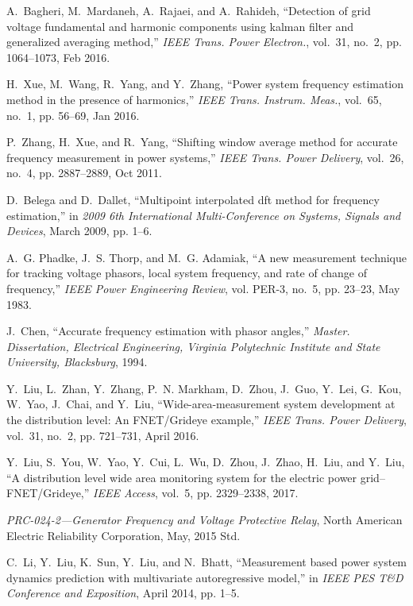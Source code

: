 \documentclass[journal,twoside]{IEEEtran}
\begin{document}
\begin{thebibliography}{10}
	A.~Bagheri, M.~Mardaneh, A.~Rajaei, and A.~Rahideh, ``Detection of grid voltage
	fundamental and harmonic components using kalman filter and generalized
	averaging method,'' \emph{IEEE Trans. Power Electron.}, vol.~31, no.~2, pp.
	1064--1073, Feb 2016.
	
	H.~Xue, M.~Wang, R.~Yang, and Y.~Zhang, ``Power system frequency estimation
	method in the presence of harmonics,'' \emph{IEEE Trans. Instrum. Meas.},
	vol.~65, no.~1, pp. 56--69, Jan 2016.
	
	P.~Zhang, H.~Xue, and R.~Yang, ``Shifting window average method for accurate
	frequency measurement in power systems,'' \emph{IEEE Trans. Power Delivery},
	vol.~26, no.~4, pp. 2887--2889, Oct 2011.
	
	D.~Belega and D.~Dallet, ``Multipoint interpolated dft method for frequency
	estimation,'' in \emph{2009 6th International Multi-Conference on Systems,
		Signals and Devices}, March 2009, pp. 1--6.
	
	A.~G. Phadke, J.~S. Thorp, and M.~G. Adamiak, ``A new measurement technique for
	tracking voltage phasors, local system frequency, and rate of change of
	frequency,'' \emph{IEEE Power Engineering Review}, vol. PER-3, no.~5, pp.
	23--23, May 1983.
	
	J.~Chen, ``Accurate frequency estimation with phasor angles,'' \emph{Master.
		Dissertation, Electrical Engineering, Virginia Polytechnic Institute and
		State University, Blacksburg}, 1994.
	
	Y.~Liu, L.~Zhan, Y.~Zhang, P.~N. Markham, D.~Zhou, J.~Guo, Y.~Lei, G.~Kou,
	W.~Yao, J.~Chai, and Y.~Liu, ``Wide-area-measurement system development at
	the distribution level: An FNET/Grideye example,'' \emph{IEEE Trans. Power
		Delivery}, vol.~31, no.~2, pp. 721--731, April 2016.
	
	Y.~Liu, S.~You, W.~Yao, Y.~Cui, L.~Wu, D.~Zhou, J.~Zhao, H.~Liu, and Y.~Liu,
	``A distribution level wide area monitoring system for the electric power
	grid–FNET/Grideye,'' \emph{IEEE Access}, vol.~5, pp. 2329--2338, 2017.
	
	\emph{PRC-024-2—Generator Frequency and Voltage Protective Relay}, North
	American Electric Reliability Corporation, May, 2015 Std.
	
	C.~Li, Y.~Liu, K.~Sun, Y.~Liu, and N.~Bhatt, ``Measurement based power system
	dynamics prediction with multivariate autoregressive model,'' in \emph{IEEE
		PES T\&D Conference and Exposition}, April 2014, pp. 1--5.
	

\end{thebibliography}
\end{document}
